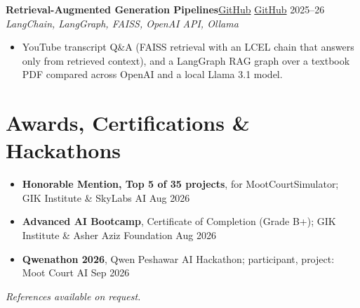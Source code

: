 \documentclass[10pt,a4paper]{article}
\newcommand{\project}[3]{%
  \par\addvspace{5pt}\needspace{6\baselineskip}\textbf{#1}\hfill{\small #2}\\[-1pt]
  {\small\itshape\color{muted} #3}\par}
\begin{document}
\project{Retrieval-Augmented Generation Pipelines}
  {\href{https://github.com/Shah-123/YouTubeVideoSummarizer}{GitHub}
   \textbar{} \href{https://github.com/Shah-123/Corrective-RAG-}{GitHub} \textbar{} 2025--26}
  {LangChain, LangGraph, FAISS, OpenAI API, Ollama}
\begin{itemize}
  \item YouTube transcript Q\&A (FAISS retrieval with an LCEL chain that answers only from retrieved
        context), and a LangGraph RAG graph over a textbook PDF compared across OpenAI and a local
        Llama 3.1 model.
\end{itemize}

\section{Awards, Certifications \& Hackathons}
\begin{itemize}
  \item \textbf{Honorable Mention, Top 5 of 35 projects}, for MootCourtSimulator; GIK Institute \&
        SkyLabs AI \hfill Aug 2026
  \item \textbf{Advanced AI Bootcamp}, Certificate of Completion (Grade B+); GIK Institute \&
        Asher Aziz Foundation \hfill Aug 2026
  \item \textbf{Qwenathon 2026}, Qwen Peshawar AI Hackathon; participant, project: Moot Court AI
        \hfill Sep 2026
\end{itemize}

\vspace{4pt}
{\small\itshape References available on request.}
\end{document}
